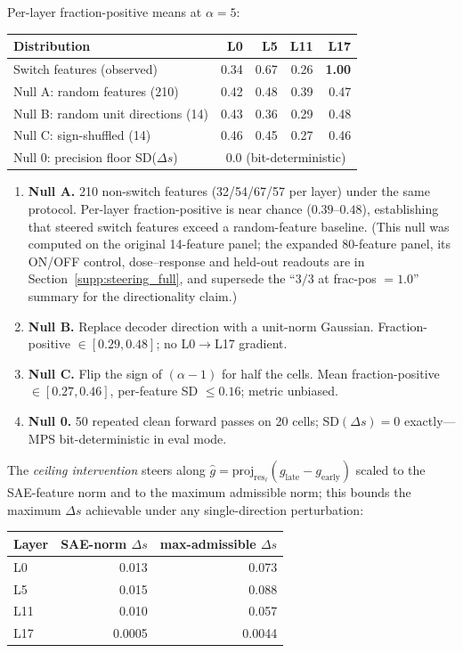 \documentclass[10pt,letterpaper]{article}
\begin{document}
Per-layer fraction-positive means at $\alpha=5$:

\begin{center}
\begin{tabular}{lrrrr}
\toprule
Distribution & L0 & L5 & L11 & L17 \\
\midrule
Switch features (observed) & 0.34 & 0.67 & 0.26 & \textbf{1.00} \\
Null A: random features (210) & 0.42 & 0.48 & 0.39 & 0.47 \\
Null B: random unit directions (14) & 0.43 & 0.36 & 0.29 & 0.48 \\
Null C: sign-shuffled (14) & 0.46 & 0.45 & 0.27 & 0.46 \\
Null 0: precision floor SD($\Delta s$) & \multicolumn{4}{c}{$0.0$ (bit-deterministic)} \\
\bottomrule
\end{tabular}
\end{center}

\begin{enumerate}
\item \textbf{Null A.} 210 non-switch features (32/54/67/57 per layer) under the same protocol. Per-layer fraction-positive is near chance ($0.39$--$0.48$), establishing that steered switch features exceed a random-feature baseline. (This null was computed on the original 14-feature panel; the expanded 80-feature panel, its ON/OFF control, dose--response and held-out readouts are in Section~\ref{supp:steering_full}, and supersede the ``$3/3$ at frac-pos $=1.0$'' summary for the directionality claim.)
\item \textbf{Null B.} Replace decoder direction with a unit-norm Gaussian. Fraction-positive $\in [0.29, 0.48]$; no L0$\to$L17 gradient.
\item \textbf{Null C.} Flip the sign of $(\alpha-1)$ for half the cells. Mean fraction-positive $\in [0.27, 0.46]$, per-feature SD $\leq 0.16$; metric unbiased.
\item \textbf{Null 0.} 50 repeated clean forward passes on 20 cells; SD$(\Delta s)=0$ exactly---MPS bit-deterministic in eval mode.
\end{enumerate}

The \emph{ceiling intervention} steers along $\hat g = \mathrm{proj}_{\mathrm{res}_\ell}(g_\text{late}-g_\text{early})$ scaled to the SAE-feature norm and to the maximum admissible norm; this bounds the maximum $\Delta s$ achievable under any single-direction perturbation:

\begin{center}
\begin{tabular}{lrr}
\toprule
Layer & SAE-norm $\Delta s$ & max-admissible $\Delta s$ \\
\midrule
L0  & 0.013 & 0.073 \\
L5  & 0.015 & 0.088 \\
L11 & 0.010 & 0.057 \\
L17 & 0.0005 & 0.0044 \\
\bottomrule
\end{tabular}
\end{center}
\end{document}
